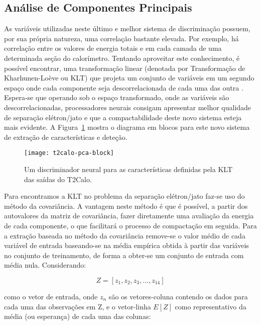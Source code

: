 \subsection{Análise de Componentes Principais}

As variáveis utilizadas neste último e melhor sistema de discriminação
possuem, por sua própria natureza, uma correlação bastante elevada. Por
exemplo, há correlação entre os valores de energia totais e em cada camada de
uma determinada seção do calorímetro. Tentando aproveitar este conhecimento, é
possível encontrar, uma transformação linear (denotada por Transformação de
Kharhunen-Loève ou KLT) que projeta um conjunto de variáveis em um segundo
espaço onde cada componente seja descorrelacionada de cada uma das outra
\cite{haykin}. Espera-se que operando sob o espaço transformado, onde as
variáveis são descorrelacionadas, processadores neurais consigam apresentar
melhor qualidade de separação elétron/jato e que a compactabilidade deste novo
sistema esteja mais evidente. A Figura~\ref{fig:t2calo-pca} mostra o diagrama
em blocos para este novo sistema de extração de características e deteção.

\begin{figure}
\begin{center}
\texttt{[image: t2calo-pca-block]}
\end{center}
\caption{Um discriminador neural para as características definidas pela KLT
das saídas do T2Calo.}
\label{fig:t2calo-pca}
\end{figure}

Para encontramos a KLT no problema da separação elétron/jato faz-se uso do
método da covariância. A vantagem neste método é que é possível, a partir
dos autovalores da matriz de covariância, fazer diretamente uma avaliação da
energia de cada componente, o que facilitará o processo de compactação em
seguida. Para a extração baseada no método da covariância remove-se o valor
médio de cada variável de entrada baseando-se na média empírica obtida à
partir das variáveis no conjunto de treinamento, de forma a obter-se um
conjunto de entrada com média nula. Considerando:

\begin{equation}
Z = [z_1, z_2, z_3, ..., z_{14}]
\end{equation}

\noindent como o vetor de entrada, onde $z_n$ são os vetores-coluna contendo
os dados para cada uma das observações em Z, e o vetor-linha $E[Z]$ como
representativo da média (ou esperança) de cada uma das colunas:

